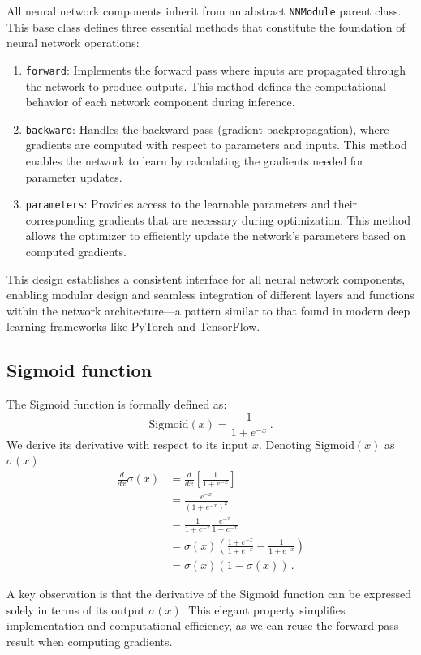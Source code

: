 \documentclass[twocolumn]{extarticle}
\begin{document}
All neural network components inherit from an abstract \texttt{NNModule} parent class. This base class defines three essential methods that constitute the foundation of neural network operations:
\begin{enumerate}
\item \texttt{forward}: Implements the forward pass where inputs are propagated through the network to produce outputs. This method defines the computational behavior of each network component during inference.
\item \texttt{backward}: Handles the backward pass (gradient backpropagation), where gradients are computed with respect to parameters and inputs. This method enables the network to learn by calculating the gradients needed for parameter updates.
\item \texttt{parameters}: Provides access to the learnable parameters and their corresponding gradients that are necessary during optimization. This method allows the optimizer to efficiently update the network's parameters based on computed gradients.
\end{enumerate}

This design establishes a consistent interface for all neural network components, enabling modular design and seamless integration of different layers and functions within the network architecture—a pattern similar to that found in modern deep learning frameworks like PyTorch and TensorFlow.

\subsection{Sigmoid function}
The Sigmoid function is formally defined as:
\begin{equation}
\text{Sigmoid}(x) = \frac{1}{1+e^{-x}} \, .
\end{equation}
We derive its derivative with respect to its input $x$. Denoting $\text{Sigmoid}(x)$ as $\sigma(x)$:
\begin{align}
\frac{d}{dx} \sigma(x) &= \frac{d}{dx} \left[\frac{1}{1+e^{-x}}\right]  \\
&= \frac{e^{-x}}{(1+e^{-x})^2} \\
&= \frac{1}{1+e^{-x}} \frac{e^{-x}}{1+e^{-x}} \\
&= \sigma(x) \left(\frac{1+e^{-x}}{1+e^{-x}} - \frac{1}{1+e^{-x}}\right) \\
&= \sigma(x) \left(1 - \sigma(x)\right) \, .
\end{align}

A key observation is that the derivative of the Sigmoid function can be expressed solely in terms of its output $\sigma(x)$. This elegant property simplifies implementation and computational efficiency, as we can reuse the forward pass result when computing gradients.
\end{document}

